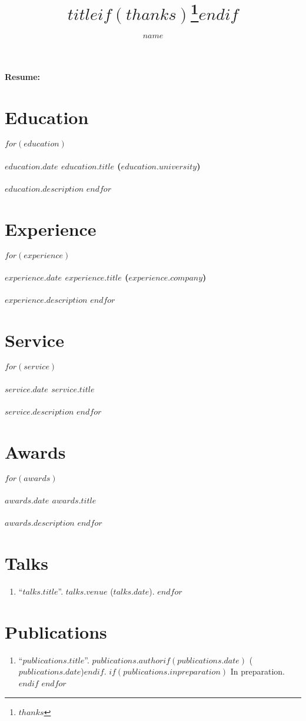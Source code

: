 \documentclass[10pt,twocolumn]{article}
\title{$title$$if(thanks)$\thanks{$thanks$}$endif$}
\author{$name$}
\date{}
\makeatletter
\renewcommand\maketitle{
    {\raggedright\begin{center}%
      {\Large\bfseries Resume: \@author}\\[3ex]
    \end{center}}
  }
\makeatother
\begin{document}
\maketitle
\thispagestyle{empty}

\section*{Education}
$for(education)$
\paragraph{$education.date$ $education.title$ ($education.university$)}
$education.description$
$endfor$

\section*{Experience}
$for(experience)$
\paragraph{$experience.date$ $experience.title$ ($experience.company$)}
$experience.description$
$endfor$

\section*{Service}
$for(service)$
\paragraph{$service.date$ $service.title$}
$service.description$
$endfor$

\section*{Awards}
$for(awards)$
\paragraph{$awards.date$ $awards.title$}
$awards.description$
$endfor$

\section*{Talks}
\begin{enumerate}
$for(talks)$
\item ``\href{$talks.link$}{$talks.title$}''. $talks.venue$ ($talks.date$).
$endfor$
\end{enumerate}

\section*{Publications}
\begin{enumerate}
$for(publications)$
\item ``\href{$publications.link$}{$publications.title$}''. $publications.author$$if(publications.date)$ ($publications.date$)$endif$.
$if(publications.inpreparation)$
In preparation.
$endif$
$endfor$
\end{enumerate}
\end{document}
